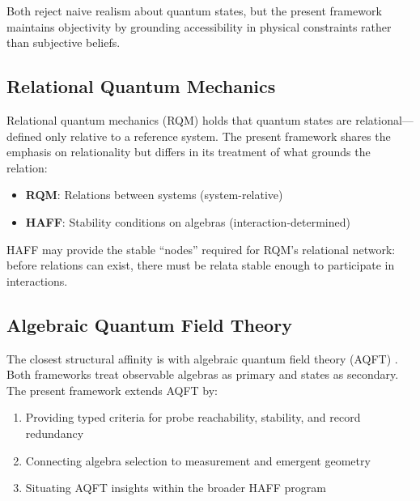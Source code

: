 \documentclass[12pt,a4paper,openany]{book}
\begin{document}
Both reject naive realism about quantum states, but the present framework maintains objectivity by grounding accessibility in physical constraints rather than subjective beliefs.

\subsection{Relational Quantum Mechanics}

Relational quantum mechanics (RQM) \cite{Rovelli1996} holds that quantum states are relational---defined only relative to a reference system. The present framework shares the emphasis on relationality but differs in its treatment of what grounds the relation:

\begin{itemize}
    \item \textbf{RQM}: Relations between systems (system-relative)
    \item \textbf{HAFF}: Stability conditions on algebras (interaction-determined)
\end{itemize}

HAFF may provide the stable ``nodes'' required for RQM's relational network: before relations can exist, there must be relata stable enough to participate in interactions.

\subsection{Algebraic Quantum Field Theory}

The closest structural affinity is with algebraic quantum field theory (AQFT) \cite{Haag1996}. Both frameworks treat observable algebras as primary and states as secondary. The present framework extends AQFT by:

\begin{enumerate}
    \item Providing typed criteria for probe reachability, stability, and record redundancy
    \item Connecting algebra selection to measurement and emergent geometry
    \item Situating AQFT insights within the broader HAFF program
\end{enumerate}
\end{document}

